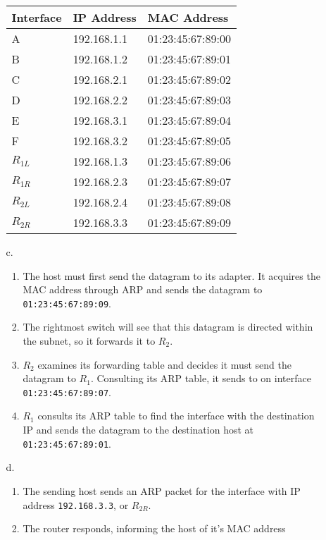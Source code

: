 \documentclass[11pt]{article}
\begin{document}
\begin{itemize}
\begin{itemize}
\begin{tabular}{ l | l | l }
          Interface & IP Address  & MAC Address \\ \hline
          A         & 192.168.1.1 & 01:23:45:67:89:00 \\ \hline
          B         & 192.168.1.2 & 01:23:45:67:89:01 \\ \hline
          C         & 192.168.2.1 & 01:23:45:67:89:02 \\ \hline
          D         & 192.168.2.2 & 01:23:45:67:89:03 \\ \hline
          E         & 192.168.3.1 & 01:23:45:67:89:04 \\ \hline
          F         & 192.168.3.2 & 01:23:45:67:89:05 \\ \hline
          $R_{1L}$  & 192.168.1.3 & 01:23:45:67:89:06 \\ \hline
          $R_{1R}$  & 192.168.2.3 & 01:23:45:67:89:07 \\ \hline
          $R_{2L}$  & 192.168.2.4 & 01:23:45:67:89:08 \\ \hline
          $R_{2R}$  & 192.168.3.3 & 01:23:45:67:89:09 \\
        \end{tabular}
      \item[c.]
        \begin{enumerate}
          \item The host must first send the datagram to its adapter.  It
                acquires the MAC address through ARP and sends the datagram to
                \texttt{01:23:45:67:89:09}.
          \item The rightmost switch will see that this datagram is directed
                within the subnet, so it forwards it to $R_2$.
          \item $R_2$ examines its forwarding table and decides it must send the
                datagram to $R_1$.  Consulting its ARP table, it sends to on
                interface \texttt{01:23:45:67:89:07}.
          \item $R_1$ consults its ARP table to find the interface with the
                destination IP and sends the datagram to the destination host at
                \texttt{01:23:45:67:89:01}.
        \end{enumerate}
      \item[d.]
        \begin{enumerate}
          \item The sending host sends an ARP packet for the interface with IP
                address \texttt{192.168.3.3}, or $R_{2R}$.
          \item The router responds, informing the host of it's MAC address

\end{enumerate}
\end{itemize}
\end{itemize}
\end{document}
